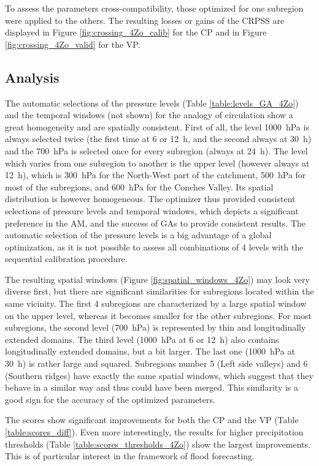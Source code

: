 \documentclass[5p]{elsarticle}
\begin{document}
To assess the parameters cross-compatibility, those optimized for one subregion were applied to the others. The resulting losses or gains of the CRPSS are displayed in Figure \ref{fig:crossing_4Zo_calib} for the CP and in Figure \ref{fig:crossing_4Zo_valid} for the VP.


\subsection{Analysis}

The automatic selections of the pressure levels (Table \ref{table:levels_GA_4Zo}) and the temporal windows (not shown) for the analogy of circulation show a great homogeneity and are spatially consistent. First of all, the level 1000~hPa is always selected twice (the first time at 6 or 12~h, and the second always at 30~h) and the 700~hPa is selected once for every subregion (always at 24~h). The level which varies from one subregion to another is the upper level (however always at 12~h), which is 300~hPa for the North-West part of the catchment, 500~hPa for most of the subregions, and 600~hPa for the Conches Valley. Its spatial distribution is however homogeneous. The optimizer thus provided consistent selections of pressure levels and temporal windows, which depicts a significant preference in the AM, and the success of GAs to provide consistent results. The automatic selection of the pressure levels is a big advantage of a global optimization, as it is not possible to assess all combinations of 4 levels with the sequential calibration procedure.

The resulting spatial windows (Figure \ref{fig:spatial_windows_4Zo}) may look very diverse first, but there are significant similarities for subregions located within the same vicinity. The first 4 subregions are characterized by a large spatial window on the upper level, whereas it becomes smaller for the other subregions. For most subregions, the second level (700~hPa) is represented by thin and longitudinally extended domains. The third level (1000~hPa at 6 or 12~h) also contains longitudinally extended domains, but a bit larger. The last one (1000~hPa at 30~h) is rather large and squared. Subregions number 5 (Left side valleys) and 6 (Southern ridges) have exactly the same spatial windows, which suggest that they behave in a similar way and thus could have been merged. This similarity is a good sign for the accuracy of the optimized parameters.

The scores show significant improvements for both the CP and the VP (Table \ref{table:scores_diff}). Even more interestingly, the results for higher precipitation thresholds (Table \ref{table:scores_thresholds_4Zo}) show the largest improvements. This is of particular interest in the framework of flood forecasting.
\end{document}
